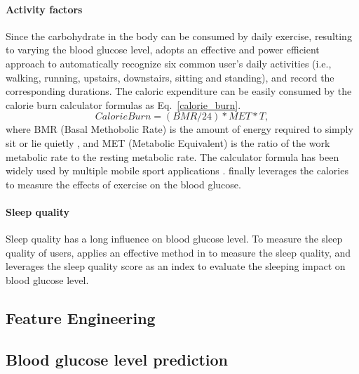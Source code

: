 \paragraph{Activity factors}
Since the carbohydrate in the body can be consumed by daily exercise, resulting to varying the blood glucose level, \sysname adopts an effective and power efficient approach \cite{bib:kwapisz2011activity} to automatically recognize six common user's daily activities (i.e., walking, running, upstairs, downstairs, sitting and standing), and record the corresponding durations. The caloric expenditure can be easily consumed by the calorie burn calculator formulas as Eq.~\ref{calorie_burn}.
\begin{equation}\label{calorie_burn}
  Calorie Burn = (BMR/24)*MET*T,
\end{equation}
where BMR (Basal Methobolic Rate) is the amount of energy required to simply sit or lie quietly \cite{}, and MET (Metabolic Equivalent) is the ratio of the work metabolic rate to the resting metabolic rate\cite{}. The calculator formula has been widely used by multiple mobile sport applications \cite{}.
\sysname finally leverages the calories to measure the effects of exercise on the blood glucose.

\paragraph{Sleep quality}
Sleep quality has a long influence on blood glucose level. To measure the sleep quality of users, \sysname applies an effective method in \cite{bib:gu2014intelligent} to measure the sleep quality, and leverages the sleep quality score as an index to evaluate the sleeping impact on blood glucose level.

\subsection{Feature Engineering}


\subsection{Blood glucose level prediction}

